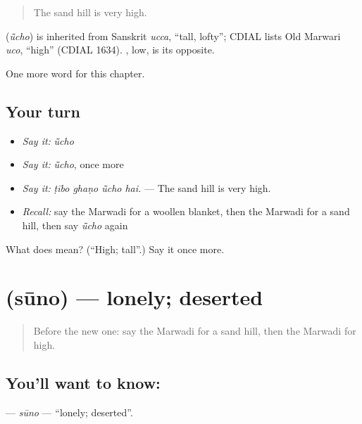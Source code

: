 \begin{quote}
The sand hill is very high.
\end{quote}

\begin{cousinweb}
\textbf{} (\emph{ū̃cho}) is inherited from Sanskrit \emph{ucca}, \textquotedblleft{}tall, lofty\textquotedblright{}; CDIAL lists Old Marwari \emph{uco}, \textquotedblleft{}high\textquotedblright{} (CDIAL 1634). \textbf{}, low, is its opposite.
\end{cousinweb}

\begin{grammarlens}[title={What you've built}]
One more word for this chapter.
\end{grammarlens}

\subsection*{Your turn}
\begin{itemize}
\raggedright
  \item \emph{Say it:} \emph{ū̃cho}
  \item \emph{Say it:} \emph{ū̃cho}, once more
  \item \emph{Say it:} \emph{ṭībo ghaṇo ū̃cho hai.} — The sand hill is very high.
  \item \emph{Recall:} say the Marwadi for a woollen blanket, then the Marwadi for a sand hill, then say \emph{ū̃cho} again
\end{itemize}

\begin{tcolorbox}[breakable,colback=teal!4,colframe=teal!35!black,title={Before you move on}]
What does  mean? (\textquotedblleft{}High; tall\textquotedblright{}.) Say it once more.
\end{tcolorbox}
\section[\texorpdfstring{\mw{सूनो} (sūno)}{सूनो (sūno)}]{ (sūno) — lonely; deserted}

\label{lesson:MW-C226-suno}



\begin{quote}
Before the new one: say the Marwadi for a sand hill, then the Marwadi for high.
\end{quote}

\subsection*{You'll want to know: }
\textbf{} — \emph{sūno} — \textquotedblleft{}lonely; deserted\textquotedblright{}.

